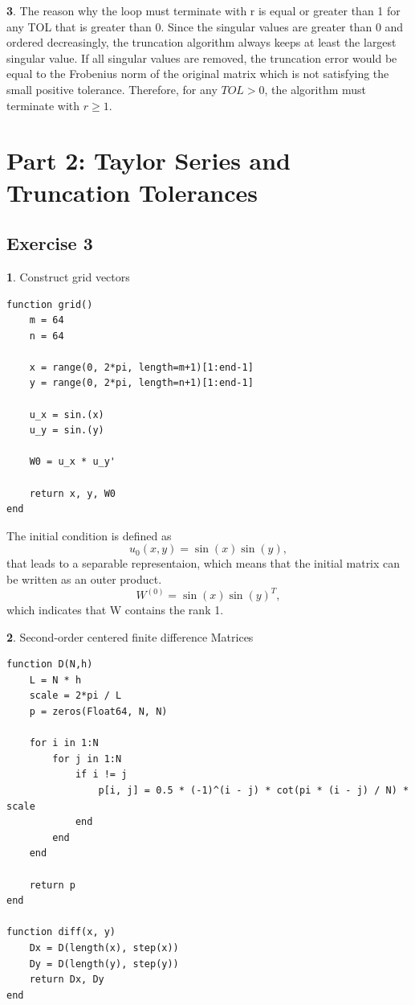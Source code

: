 \documentclass[11pt]{article}
\begin{document}
\vspace{1.5em}
\textbf{3}. The reason why the loop must terminate with r is equal or greater than 1 for any TOL that is greater than 0.
\vspace{1.5em}
Since the singular values are greater than 0 and ordered decreasingly, the truncation algorithm always keeps at least the largest singular value. If all singular values are removed, the truncation error would be equal to the Frobenius norm of the original matrix which is not satisfying the small positive tolerance. Therefore, for any $TOL > 0$, the algorithm must terminate
with $r \geq 1$.

\section*{Part 2: Taylor Series and Truncation Tolerances}
\subsection*{Exercise 3}
\textbf{1}. Construct grid vectors

\begin{lstlisting}
function grid()
    m = 64
    n = 64

    x = range(0, 2*pi, length=m+1)[1:end-1]
    y = range(0, 2*pi, length=n+1)[1:end-1]

    u_x = sin.(x)
    u_y = sin.(y)

    W0 = u_x * u_y'

    return x, y, W0
end

\end{lstlisting}
The initial condition is defined as
\[
u_0(x,y) = \sin(x)\sin(y),
\]
that leads to a separable representaion, which means that the initial matrix can be written as an outer product.
\[
W^{(0)} = \sin(x)\sin(y)^T,
\]
which indicates that W contains the rank 1.

\vspace{1.5em}
\textbf{2}. Second-order centered finite difference Matrices

\begin{lstlisting}
function D(N,h)
    L = N * h
    scale = 2*pi / L
    p = zeros(Float64, N, N)

    for i in 1:N
        for j in 1:N
            if i != j
                p[i, j] = 0.5 * (-1)^(i - j) * cot(pi * (i - j) / N) * scale
            end
        end
    end

    return p
end

function diff(x, y)
    Dx = D(length(x), step(x))
    Dy = D(length(y), step(y))
    return Dx, Dy
end

\end{lstlisting}
\end{document}
